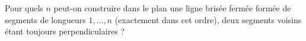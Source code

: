 Pour quels $n$ peut-on construire dans le plan une ligne brisée fermée formée de segments de longueurs $1, \ldots, n$ (exactement dans cet ordre), deux segments voisins étant toujours perpendiculaires ?
